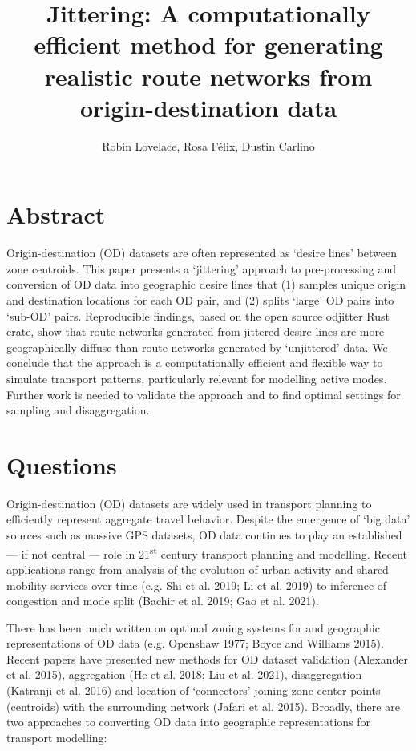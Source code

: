 \documentclass[
]{article}
\title{Jittering: A computationally efficient method for generating realistic route networks from origin-destination data}
\author{Robin Lovelace, Rosa Félix, Dustin Carlino}
\date{}
\begin{document}
\maketitle

{
\setcounter{tocdepth}{2}
\tableofcontents
}
\hypertarget{abstract}{%
\section*{Abstract}\label{abstract}}

Origin-destination (OD) datasets are often represented as `desire lines' between zone centroids.
This paper presents a `jittering' approach to pre-processing and conversion of OD data into geographic desire lines that (1) samples unique origin and destination locations for each OD pair, and (2) splits `large' OD pairs into `sub-OD' pairs.
Reproducible findings, based on the open source odjitter Rust crate, show that route networks generated from jittered desire lines are more geographically diffuse than route networks generated by `unjittered' data.
We conclude that the approach is a computationally efficient and flexible way to simulate transport patterns, particularly relevant for modelling active modes.
Further work is needed to validate the approach and to find optimal settings for sampling and disaggregation.

\hypertarget{questions}{%
\section{Questions}\label{questions}}

Origin-destination (OD) datasets are widely used in transport planning to efficiently represent aggregate travel behavior.
Despite the emergence of `big data' sources such as massive GPS datasets, OD data continues to play an established --- if not central --- role in 21\textsuperscript{st} century transport planning and modelling.
Recent applications range from analysis of the evolution of urban activity and shared mobility services over time (e.g. Shi et al. 2019; Li et al. 2019) to inference of congestion and mode split (Bachir et al. 2019; Gao et al. 2021).

There has been much written on optimal zoning systems for and geographic representations of OD data (e.g. Openshaw 1977; Boyce and Williams 2015).
Recent papers have presented new methods for OD dataset validation (Alexander et al. 2015), aggregation (He et al. 2018; Liu et al. 2021), disaggregation (Katranji et al. 2016) and location of `connectors' joining zone center points (centroids) with the surrounding network (Jafari et al. 2015).
Broadly, there are two approaches to converting OD data into geographic representations for transport modelling:
\end{document}

